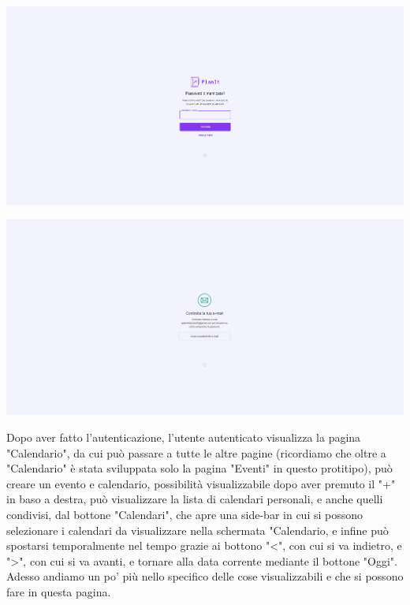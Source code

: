 \begin{center}
    \includegraphics[width=1\textwidth, height=0.3\textheight]{img/png/FrontEnd/Homepage_Autenticazione/recupero_password.png}
\end{center}

\begin{center}
    \includegraphics[width=1\textwidth, height=0.3\textheight]{img/png/FrontEnd/Homepage_Autenticazione/controlla_email.png}
\end{center}

Dopo aver fatto l'autenticazione, l'utente autenticato visualizza la pagina "Calendario", da cui può passare a tutte le altre pagine (ricordiamo che oltre a "Calendario" è stata sviluppata solo la pagina "Eventi" in questo protitipo), può creare un evento e calendario, possibilità visualizzabile dopo aver premuto il "+" in baso a destra, può visualizzare la lista di calendari personali, e anche quelli condivisi, dal bottone "Calendari", che apre una side-bar in cui si possono selezionare i calendari da visualizzare nella schermata "Calendario, e infine può spostarsi temporalmente nel tempo grazie ai bottono "<", con cui si va indietro, e ">", con cui si va avanti, e tornare alla data corrente mediante il bottone "Oggi". Adesso andiamo un po' più nello specifico delle cose visualizzabili e che si possono fare in questa pagina.

